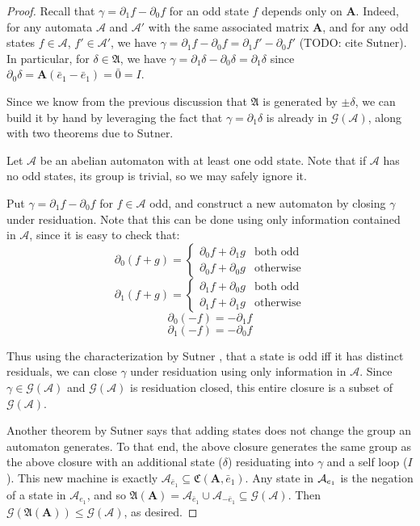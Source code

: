 \documentclass[runningheads]{llncs}
\newcommand{\A}{\mathcal{A}}
\newcommand{\G}{\mathcal{G}}
\renewcommand{\P}{\mathfrak{A}}
\newcommand{\2}{\textbf{2}}
\newcommand{\Am}{\textbf{A}}
\newcommand{\del}{\partial}
\newcommand{\e}{\bar{e}}
\begin{document}
\begin{proof}
  Recall that $\gamma = \del_1 f - \del_0 f$ for an odd state $f$ depends 
  only on $\Am$. Indeed, for any automata $\A$ and $\A'$ with the same
  associated matrix $\Am$, and for any odd states $f \in \A$, $f' \in \A'$, 
  we have $\gamma = \del_1 f - \del_0 f = \del_1 f' - \del_0 f'$
  (TODO: cite Sutner). In particular, for $\delta \in \P$, we have 
  $\gamma = \del_1 \delta - \del_0 \delta = \del_1 \delta$ since
  $\del_0 \delta = \Am(\e_1 - \e_1) = \bar{0} = I$.

  Since we know from the previous discussion that $\P$ is generated by
  $\pm \delta$, we can build it by hand by leveraging the fact that 
  $\gamma = \del_1 \delta$ is already in $\G(\A)$, along with two theorems
  due to Sutner.

  Let $\A$ be an abelian automaton with at least one odd state.
  Note that if $\A$ has no odd states, its group is trivial, so we may
  safely ignore it.

  Put $\gamma = \del_1 f - \del_0 f$ for $f \in \A$ odd, and construct
  a new automaton by closing $\gamma$ under residuation.
  Note that this can be done using only information contained in $\A$,
  since it is easy to check that:
  \[
    \del_0(f + g) = \begin{cases} \del_0 f + \del_1 g & \text{both odd}\\
                                  \del_0 f + \del_0 g & \text{otherwise}
                    \end{cases}
  \]
  \[
    \del_1(f + g) = \begin{cases} \del_1 f + \del_0 g & \text{both odd}\\
                                  \del_1 f + \del_1 g & \text{otherwise}
                    \end{cases}
  \]
  \[
    \del_0 (-f) = - \del_1 f
  \]
  \[
    \del_1 (-f) = - \del_0 f
  \]

  Thus using the characterization by Sutner \cite{Sutner18:abelian_automata}, 
  that a state is odd iff it has distinct residuals, we can close $\gamma$ 
  under residuation using only information in $\A$.
  Since $\gamma \in \G(\A)$ and $\G(\A)$ is residuation closed, 
  this entire closure is a subset of $\G(\A)$. 

  Another theorem by Sutner \cite{Sutner18:abelian_automata} says that adding
  states does not change the group an automaton generates. 
  To that end, the above closure generates the same group
  as the above closure with an additional state ($\delta$) residuating into 
  $\gamma$ and a self loop ($I$). This new machine is exactly
  $\A_{\e_1} \subseteq \mathfrak{C}(\Am,\e_1)$. Any state in $\A_{\-e_1}$ is
  the negation of a state in $\A_{e_1}$, and so 
  $\P(\Am) = \A_{\e_1} \cup \A_{-\e_1} \subseteq \G(\A)$. 
  Then $\G(\P(\Am)) \leq \G(\A)$, as desired.
\end{proof}
\end{document}
